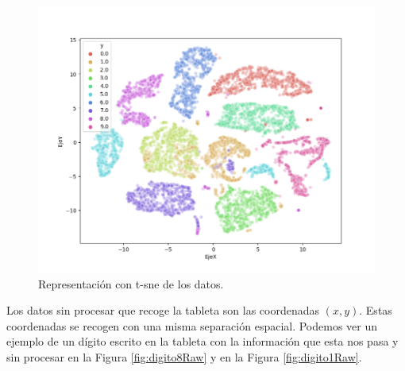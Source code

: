 \documentclass[12pt,a4paper]{article}
\begin{document}
\begin{figure}[H]
	\centering
	\includegraphics[scale=0.5]{images/tsne.png}
	\caption[Representación con t-sne de los datos]{Representación con t-sne de los datos.}
	\label{fig:tsne}
\end{figure}
Los datos sin procesar que recoge la tableta son las coordenadas $(x,y)$. Estas coordenadas se recogen con una misma separación espacial. Podemos ver un ejemplo de un dígito escrito en la tableta con la información que esta nos pasa y sin procesar en la Figura \ref{fig:digito8Raw} y en la Figura \ref{fig:digito1Raw}.
\end{document}
